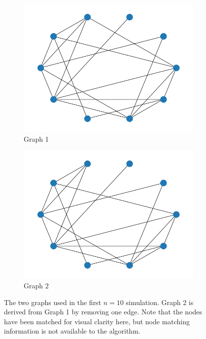 \begin{figure}
\centering
\begin{subfigure}{0.45\textwidth}
    \centering
    \includegraphics[width=\textwidth]{Figs/n=10_graph_1.png}
    \caption{Graph 1}
\end{subfigure}
\hfill
\begin{subfigure}{0.45\textwidth}
    \centering
    \includegraphics[width=\textwidth]{Figs/n=10_graph_2.png}
    \caption{Graph 2}
\end{subfigure}
\caption{The two graphs used in the first $n=10$ simulation. Graph 2 is derived from Graph 1 by removing one edge. Note that the nodes have been matched for visual clarity here, but node matching information is not available to the algorithm.}
\label{fig:graphs}
\end{figure}

